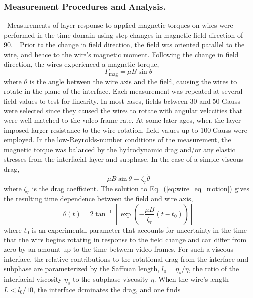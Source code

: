 \subsubsection{Measurement Procedures and Analysis.}~Measurements of layer response to applied magnetic torques on wires were performed in the time domain using step changes in magnetic-field direction of 90\degree.~~Prior to the change in field direction, the field was oriented parallel to the wire, and hence to the wire's magnetic moment. Following the change in field direction, the wires experienced a magnetic torque, 
\begin{equation}
\Gamma_\text{mag} = \mu B \sin{\theta}
\end{equation}
where $\theta$ is the angle between the wire axis and the field, causing the wires to rotate in the plane of the interface.  Each measurement was repeated at several field values to test for linearity.  In most cases, fields between 30 and 50 Gauss were selected since they caused the wires to rotate with angular velocities that were well matched to the video frame rate.  At some later ages, when the layer imposed larger resistance to the wire rotation, field values up to 100 Gauss were employed.   In the low-Reynolds-number conditions of the measurement, the magnetic torque was balanced by the hydrodynamic drag and/or any elastic stresses from the interfacial layer and subphase.  In the case of a simple viscous drag, 
\begin{equation}
  \mu B \sin\theta = \zeta_r \dot{\theta}
  \label{eq:wire_eq_motion}
\end{equation}
\noindent where $\zeta_r$ is the drag coefficient.  The solution to Eq.~(\ref{eq:wire_eq_motion}) gives the resulting time dependence between the field and wire axis,\cite{Anguelouch2006b} 
\begin{equation}
  \theta(t) = 2 \tan^{-1} \left[ \exp \left( -\frac{\mu B}{\zeta_r} (t-t_0) \right) \right]
  \label{eq:sasha}
\end{equation}
where $t_0$ is an experimental parameter that accounts for uncertainty in the time that the wire begins rotating in response to the field change and can differ from zero by an amount up to the time between video frames.  For such a viscous interface, the relative contributions to the rotational drag from the interface and subphase are parameterized by the Saffman length, $l_0=\eta_s/\eta$, the ratio of the interfacial viscosity $\eta_s$ to the subphase viscosity $\eta$. When the wire's length $L < l_0/10$, the interface dominates the drag, and one finds \cite{Levine2004}


